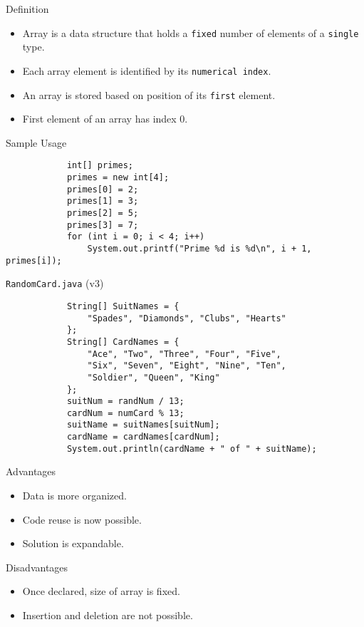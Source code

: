\documentclass[10pt, compress]{beamer}
\begin{document}
\begin{slide}
	\begin{block}{Definition}
		\begin{itemize}
			\item[] Array is a data structure that holds a \texttt{fixed} number of elements of a \texttt{single} type.
			\item[] Each array element is identified by its \texttt{numerical index}.
			\item[] An array is stored based on position of its \texttt{first} element.
			\item[] First element of an array has index 0.
		\end{itemize}
	\end{block}
\end{slide}

\begin{slide}
	\begin{block}{Sample Usage}
		\begin{verbatim}
			int[] primes;
			primes = new int[4];
			primes[0] = 2;
			primes[1] = 3;
			primes[2] = 5;
			primes[3] = 7;
			for (int i = 0; i < 4; i++)
			    System.out.printf("Prime %d is %d\n", i + 1, primes[i]);
		\end{verbatim}
	\end{block}
\end{slide}

\begin{slide}
	\begin{block}{\texttt{RandomCard.java} (v3)}
		\begin{verbatim}
			String[] SuitNames = {
			    "Spades", "Diamonds", "Clubs", "Hearts"
			};
			String[] CardNames = {
			    "Ace", "Two", "Three", "Four", "Five",
			    "Six", "Seven", "Eight", "Nine", "Ten",
			    "Soldier", "Queen", "King"
			};
			suitNum = randNum / 13;
			cardNum = numCard % 13;
			suitName = suitNames[suitNum];
			cardName = cardNames[cardNum];
			System.out.println(cardName + " of " + suitName);
		\end{verbatim}
	\end{block}
\end{slide}

\begin{slide}
	\begin{block}{Advantages}
		\begin{itemize}
			\item[] Data is more organized.
			\item[] Code reuse is now possible.
			\item[] Solution is expandable.
		\end{itemize}
	\end{block}
	\begin{block}{Disadvantages}
		\begin{itemize}
			\item[] Once declared, size of array is fixed.
			\item[] Insertion and deletion are not possible.
		\end{itemize}
	\end{block}
\end{slide}
\end{document}
